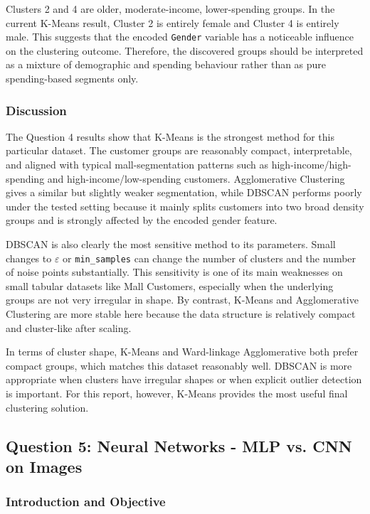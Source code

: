 \documentclass[11pt]{article}
\begin{document}
Clusters 2 and 4 are older, moderate-income, lower-spending groups. In the current K-Means result, Cluster 2 is entirely female and Cluster 4 is entirely male. This suggests that the encoded \texttt{Gender} variable has a noticeable influence on the clustering outcome. Therefore, the discovered groups should be interpreted as a mixture of demographic and spending behaviour rather than as pure spending-based segments only.

\subsubsection{Discussion}

The Question 4 results show that K-Means is the strongest method for this particular dataset. The customer groups are reasonably compact, interpretable, and aligned with typical mall-segmentation patterns such as high-income/high-spending and high-income/low-spending customers. Agglomerative Clustering gives a similar but slightly weaker segmentation, while DBSCAN performs poorly under the tested setting because it mainly splits customers into two broad density groups and is strongly affected by the encoded gender feature.

DBSCAN is also clearly the most sensitive method to its parameters. Small changes to \(\varepsilon\) or \texttt{min\_samples} can change the number of clusters and the number of noise points substantially. This sensitivity is one of its main weaknesses on small tabular datasets like Mall Customers, especially when the underlying groups are not very irregular in shape. By contrast, K-Means and Agglomerative Clustering are more stable here because the data structure is relatively compact and cluster-like after scaling.

In terms of cluster shape, K-Means and Ward-linkage Agglomerative both prefer compact groups, which matches this dataset reasonably well. DBSCAN is more appropriate when clusters have irregular shapes or when explicit outlier detection is important. For this report, however, K-Means provides the most useful final clustering solution.

\subsection{Question 5: Neural Networks - MLP vs. CNN on Images}

\subsubsection{Introduction and Objective}
\end{document}
